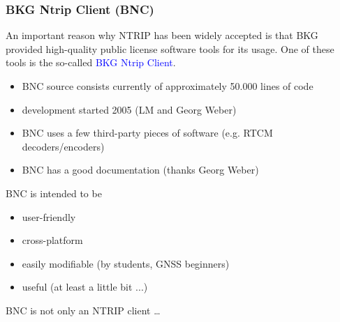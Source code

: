 \documentclass[10pt]{beamer}
\begin{document}
\begin{frame}
\frametitle{BKG Ntrip Client (BNC)}

An important reason why NTRIP has been widely accepted is that BKG provided high-quality public
license software tools for its usage. One of these tools is the so-called \textcolor{blue}{BKG
Ntrip Client}.

  \begin{itemize}
  \item BNC source consists currently of approximately 50.000 lines of code 
  \item development started 2005 (LM and Georg Weber)
  \item BNC uses a few third-party pieces of software (e.g. RTCM decoders/encoders)
  \item BNC has a good documentation (thanks Georg Weber)
  \end{itemize}

  \begin{block}{BNC is intended to be}
  \begin{itemize}
  \item user-friendly
  \item cross-platform
  \item easily modifiable (by students, GNSS beginners)
  \item useful (at least a little bit ...)
  \end{itemize}
  \end{block}

  \begin{block}{BNC is not only an NTRIP client \ldots}
  \end{block}

\end{frame}

\end{document}

